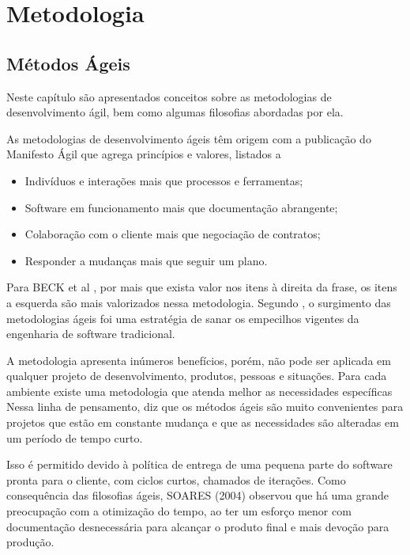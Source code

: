 \chapter[Metodologia]{Metodologia}

\section{Métodos Ágeis}
\label{sec:Métodos Ágeis}

Neste capítulo são apresentados conceitos sobre as metodologias de
desenvolvimento ágil, bem como algumas filosofias abordadas por ela.

As metodologias de desenvolvimento ágeis têm origem com a publicação
do Manifesto Ágil \cite{manifestoAgil} que agrega princípios e valores, listados a

\begin{itemize}
  \item Indivíduos e interações mais que processos e ferramentas;
    \item Software em funcionamento mais que documentação abrangente;
    \item Colaboração com o cliente mais que negociação de contratos;
    \item Responder a mudanças mais que seguir um plano.
\end{itemize}

Para BECK et al \cite{manifestoAgil}, por mais que exista valor nos itens à direita da
frase, os itens a esquerda são mais valorizados nessa metodologia.
Segundo \cite{pressman}, o surgimento das metodologias ágeis foi uma
estratégia de sanar os empecilhos vigentes da engenharia de software tradicional.


A metodologia apresenta inúmeros benefícios, porém, não pode ser aplicada em
qualquer projeto de desenvolvimento, produtos, pessoas e situações. Para cada
ambiente existe uma metodologia que atenda melhor as necessidades específicas
Nessa linha de pensamento, \cite{pressman} diz que os métodos ágeis
são muito convenientes para projetos que estão em constante mudança e que as
necessidades são alteradas em um período de tempo curto.

Isso é permitido
devido à política de entrega de uma pequena parte do software pronta para o
cliente, com ciclos curtos, chamados de iterações.
Como consequência das filosofias ágeis, SOARES (2004) observou que
há uma grande preocupação com a otimização do tempo, ao ter um esforço
menor com documentação desnecessária para alcançar o produto final e mais
devoção para produção.

